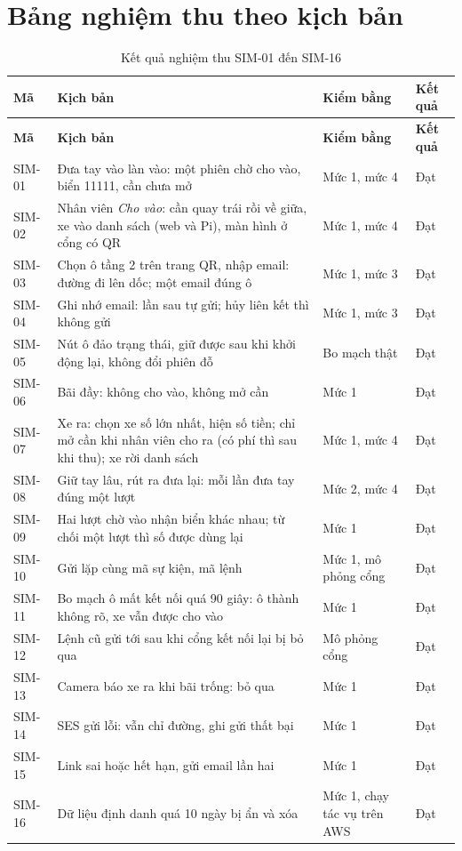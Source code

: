 \section{Bảng nghiệm thu theo kịch bản}

\begin{longtable}{@{}P{1.3cm}P{7.4cm}P{3.1cm}P{2.3cm}@{}}
\caption{Kết quả nghiệm thu SIM-01 đến SIM-16}\label{tab:nghiemthu}\\
\toprule
\textbf{Mã} & \textbf{Kịch bản} & \textbf{Kiểm bằng} & \textbf{Kết quả} \\ \midrule
\endfirsthead
\toprule
\textbf{Mã} & \textbf{Kịch bản} & \textbf{Kiểm bằng} & \textbf{Kết quả} \\ \midrule
\endhead
SIM-01 & Đưa tay vào làn vào: một phiên chờ cho vào, biển 11111, cần chưa mở & Mức 1, mức 4 & Đạt \\
SIM-02 & Nhân viên \emph{Cho vào}: cần quay trái rồi về giữa, xe vào danh sách (web và Pi), màn hình ở cổng có QR & Mức 1, mức 4 & Đạt \\
SIM-03 & Chọn ô tầng 2 trên trang QR, nhập email: đường đi lên dốc; một email đúng ô & Mức 1, mức 3 & Đạt \\
SIM-04 & Ghi nhớ email: lần sau tự gửi; hủy liên kết thì không gửi & Mức 1, mức 3 & Đạt \\
SIM-05 & Nút ô đảo trạng thái, giữ được sau khi khởi động lại, không đổi phiên đỗ & Bo mạch thật & Đạt \\
SIM-06 & Bãi đầy: không cho vào, không mở cần & Mức 1 & Đạt \\
SIM-07 & Xe ra: chọn xe số lớn nhất, hiện số tiền; chỉ mở cần khi nhân viên cho ra (có phí thì sau khi thu); xe rời danh sách & Mức 1, mức 4 & Đạt \\
SIM-08 & Giữ tay lâu, rút ra đưa lại: mỗi lần đưa tay đúng một lượt & Mức 2, mức 4 & Đạt \\
SIM-09 & Hai lượt chờ vào nhận biển khác nhau; từ chối một lượt thì số được dùng lại & Mức 1 & Đạt \\
SIM-10 & Gửi lặp cùng mã sự kiện, mã lệnh & Mức 1, mô phỏng cổng & Đạt \\
SIM-11 & Bo mạch ô mất kết nối quá 90 giây: ô thành không rõ, xe vẫn được cho vào & Mức 1 & Đạt \\
SIM-12 & Lệnh cũ gửi tới sau khi cổng kết nối lại bị bỏ qua & Mô phỏng cổng & Đạt \\
SIM-13 & Camera báo xe ra khi bãi trống: bỏ qua & Mức 1 & Đạt \\
SIM-14 & SES gửi lỗi: vẫn chỉ đường, ghi gửi thất bại & Mức 1 & Đạt \\
SIM-15 & Link sai hoặc hết hạn, gửi email lần hai & Mức 1 & Đạt \\
SIM-16 & Dữ liệu định danh quá 10 ngày bị ẩn và xóa & Mức 1, chạy tác vụ trên AWS & Đạt \\
\bottomrule
\end{longtable}

